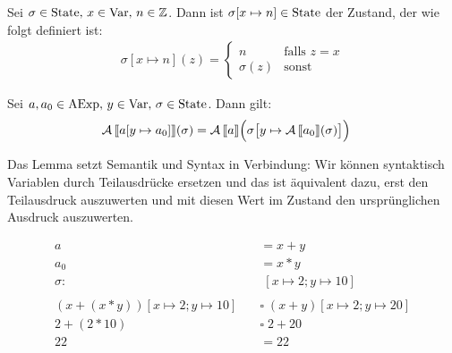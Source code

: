 \begin{definition}\label{def:substitutionState}
    Sei $\sigma \in \operatorname{State}, \, x \in \operatorname{Var}, \, n \in \mathbb{Z}$. Dann ist $\sigma[x \mapsto n] \in \operatorname{State}$ der Zustand, der wie folgt definiert ist:
    \begin{align*}
        \sigma[x \mapsto n](z) = \begin{cases}
            n & \text{falls } z = x \\
            \sigma(z) & \text{sonst}
        \end{cases}
    \end{align*}
\end{definition}

\begin{lemma}
    Sei $a, a_0 \in \operatorname{AExp}, \, y \in \operatorname{Var}, \, \sigma \in \operatorname{State}$. Dann gilt:
    \begin{align*}
        \operatorname{\mathcal{A}}\mathrm{[}\kern-.14em\mathrm{[} a[y \mapsto a_0] \mathrm{]}\kern-.14em\mathrm{]}(\sigma) & = \operatorname{\mathcal{A}}\mathrm{[}\kern-.14em\mathrm{[} a \mathrm{]}\kern-.14em\mathrm{]} \Big( \sigma\big[y \mapsto \operatorname{\mathcal{A}}\mathrm{[}\kern-.14em\mathrm{[} a_0 \mathrm{]}\kern-.14em\mathrm{]}(\sigma)\big] \Big)
    \end{align*}
\end{lemma}

Das Lemma setzt Semantik und Syntax in Verbindung: Wir können syntaktisch Variablen durch Teilausdrücke ersetzen und das ist äquivalent dazu, erst den Teilausdruck auszuwerten und mit diesen Wert im Zustand den ursprünglichen Ausdruck auszuwerten.

\begin{example}
    \begin{align*}
    a & = x + y \\
    a_0 & = x * y \\
    \sigma: & \; [x \mapsto 2; y \mapsto 10] \\
    \\
    (x + (x * y))[x \mapsto 2; y \mapsto 10] \quad & \square\; (x + y)[x \mapsto 2; y \mapsto 20] \\
    2 + (2 * 10) \quad & \square\; 2 + 20 \\
    22 \quad & = 22
\end{align*}
\end{example}



